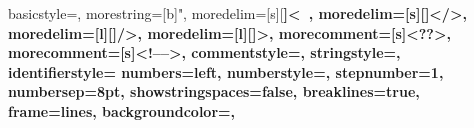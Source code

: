 {
    basicstyle=\ttfamily\footnotesize,
    morestring=[b]",
    moredelim=[s][\bfseries\color{Maroon}]{<}{\ },
    moredelim=[s][\bfseries\color{Maroon}]{</}{>},
    moredelim=[l][\bfseries\color{Maroon}]{/>},
    moredelim=[l][\bfseries\color{Maroon}]{>},
    morecomment=[s]{<?}{?>},
    morecomment=[s]{<!--}{-->},
    commentstyle=\color{DarkOliveGreen},
    stringstyle=\color{blue},
    identifierstyle=\color{red}
    numbers=left,
    numberstyle=\scriptsize,
    stepnumber=1,
    numbersep=8pt,
    showstringspaces=false,
    breaklines=true,
    frame=lines,
    backgroundcolor=\color{background},    
}